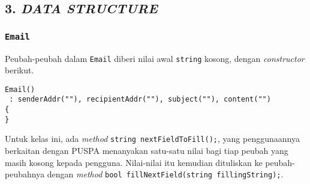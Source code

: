 \subsection*{\textcolor{subsectioncolor}{\textsf{3. \textit{DATA STRUCTURE}}}}

\subsubsection*{\texttt{Email}}

Peubah-peubah dalam \texttt{Email} diberi nilai awal \texttt{string} kosong,
dengan \textit{constructor} berikut.
\begin{verbatim}
Email()
 : senderAddr(""), recipientAddr(""), subject(""), content("")
{
}
\end{verbatim}

Untuk kelas ini, ada \textit{method} \verb!string nextFieldToFill();!,
yang penggunaannya berkaitan dengan PUSPA menanyakan satu-satu nilai bagi tiap peubah yang masih kosong kepada pengguna.
Nilai-nilai itu kemudian dituliskan ke peubah-peubahnya dengan \textit{method} \verb!bool fillNextField(string fillingString);!.

